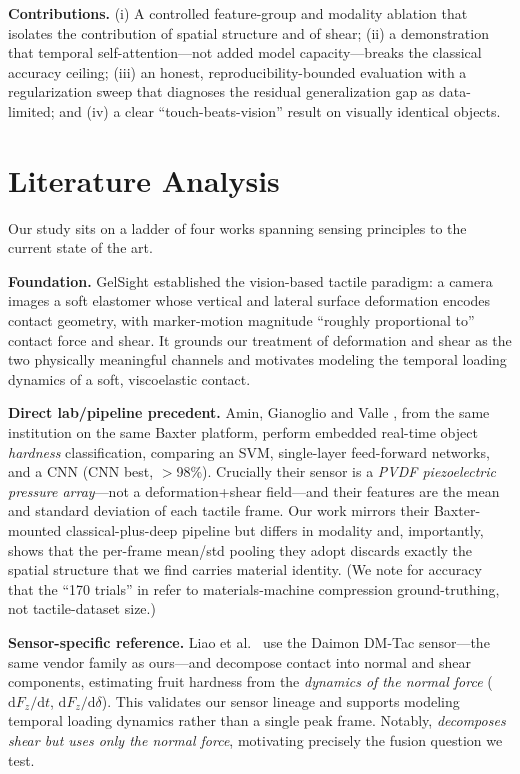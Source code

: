 \documentclass[conference]{IEEEtran}
\begin{document}
\noindent\textbf{Contributions.} (i) A controlled feature-group and modality
ablation that isolates the contribution of spatial structure and of shear; (ii)
a demonstration that temporal self-attention---not added model
capacity---breaks the classical accuracy ceiling; (iii) an honest,
reproducibility-bounded evaluation with a regularization sweep that diagnoses
the residual generalization gap as data-limited; and (iv) a clear
``touch-beats-vision'' result on visually identical objects.

\section{Literature Analysis}
Our study sits on a ladder of four works spanning sensing principles to the
current state of the art.

\textbf{Foundation.} GelSight \cite{gelsight} established the vision-based
tactile paradigm: a camera images a soft elastomer whose vertical and lateral
surface deformation encodes contact geometry, with marker-motion magnitude
``roughly proportional to'' contact force and shear. It grounds our treatment of
deformation and shear as the two physically meaningful channels and motivates
modeling the temporal loading dynamics of a soft, viscoelastic contact.

\textbf{Direct lab/pipeline precedent.} Amin, Gianoglio and Valle
\cite{amin2023}, from the same institution on the same Baxter platform, perform
embedded real-time object \emph{hardness} classification, comparing an SVM,
single-layer feed-forward networks, and a CNN (CNN best, $>$98\%). Crucially
their sensor is a \emph{PVDF piezoelectric pressure array}---not a
deformation+shear field---and their features are the mean and standard deviation
of each tactile frame. Our work mirrors their Baxter-mounted classical-plus-deep
pipeline but differs in modality and, importantly, shows that the per-frame
mean/std pooling they adopt discards exactly the spatial structure that we find
carries material identity. (We note for accuracy that the ``170 trials'' in
\cite{amin2023} refer to materials-machine compression ground-truthing, not
tactile-dataset size.)

\textbf{Sensor-specific reference.} Liao et al.\ \cite{liao2025} use the Daimon
DM-Tac sensor---the same vendor family as ours---and decompose contact into
normal and shear components, estimating fruit hardness from the
\emph{dynamics of the normal force} ($\mathrm{d}F_z/\mathrm{d}t$,
$\mathrm{d}F_z/\mathrm{d}\delta$). This validates our sensor lineage and supports
modeling temporal loading dynamics rather than a single peak frame. Notably,
\cite{liao2025} \emph{decomposes shear but uses only the normal force},
motivating precisely the fusion question we test.
\end{document}
